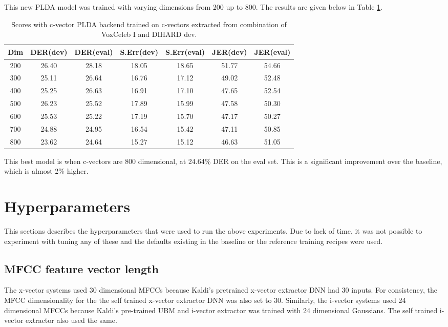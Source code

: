	This new PLDA model was trained with varying dimensions from 200 up to 800. The results are given below in Table \ref{table-cvector}.
	\begin{table}[h]
		\centering
		\begin{tabular}{|c|c|c|c|c|c|c|}
			\hline
			Dim & DER(dev) & DER(eval) & S.Err(dev) & S.Err(eval) & JER(dev) & JER(eval) \\
			\hline
			200 & 26.40 & 28.18 & 18.05 & 18.65 & 51.77 & 54.66 \\
			300 & 25.11 & 26.64 & 16.76 & 17.12 & 49.02 & 52.48 \\
			400 & 25.25 & 26.63 & 16.91 & 17.10 & 47.65 & 52.54 \\
			500 & 26.23 & 25.52 & 17.89 & 15.99 & 47.58 & 50.30 \\
			600 & 25.53 & 25.22 & 17.19 & 15.70 & 47.17 & 50.27 \\
			700 & 24.88 & 24.95 & 16.54 & 15.42 & 47.11 & 50.85 \\
			800 & 23.62 & 24.64 & 15.27 & 15.12 & 46.63 & 51.05 \\
			\hline
		\end{tabular}
		\caption{Scores with c-vector PLDA backend trained on c-vectors extracted from combination of VoxCeleb I and DIHARD dev.}
		\label{table-cvector}
	\end{table}

	This best model is when c-vectors are 800 dimensional, at 24.64\% DER on the eval set. This is a significant improvement over the baseline, which is almost 2\% higher.
	
	\section{Hyperparameters}
		This sections describes the hyperparameters that were used to run the above experiments. Due to lack of time, it was not possible to experiment with tuning any of these and the defaults existing in the baseline or the reference training recipes were used.\\
		\subsection{MFCC feature vector length}
			The x-vector systems used 30 dimensional MFCCs because Kaldi's pretrained x-vector extractor DNN had 30 inputs. For consistency, the MFCC dimensionality for the the self trained x-vector extractor DNN was also set to 30.
			Similarly, the i-vector systems used 24 dimensional MFCCs because Kaldi's pre-trained UBM and i-vector extractor was trained with 24 dimensional Gaussians. The self trained i-vector extractor also used the same.
